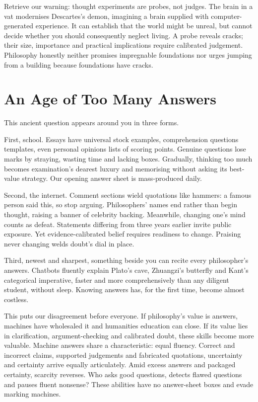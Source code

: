 Retrieve our warning: thought experiments are probes, not judges. The brain in a vat modernises Descartes's demon, imagining a brain supplied with computer-generated experience. It can establish that the world might be unreal, but cannot decide whether you should consequently neglect living. A probe reveals cracks; their size, importance and practical implications require calibrated judgement. Philosophy honestly neither promises impregnable foundations nor urges jumping from a building because foundations have cracks.

\section{An Age of Too Many Answers}
This ancient question appears around you in three forms.

First, school. Essays have universal stock examples, comprehension questions templates, even personal opinions lists of scoring points. Genuine questions lose marks by straying, wasting time and lacking boxes. Gradually, thinking too much becomes examination's dearest luxury and memorising without asking its best-value strategy. Our opening answer sheet is mass-produced daily.

Second, the internet. Comment sections wield quotations like hammers: a famous person said this, so stop arguing. Philosophers' names end rather than begin thought, raising a banner of celebrity backing. Meanwhile, changing one's mind counts as defeat. Statements differing from three years earlier invite public exposure. Yet evidence-calibrated belief requires readiness to change. Praising never changing welds doubt's dial in place.

Third, newest and sharpest, something beside you can recite every philosopher's answers. Chatbots fluently explain Plato's cave, Zhuangzi's butterfly and Kant's categorical imperative, faster and more comprehensively than any diligent student, without sleep. Knowing answers has, for the first time, become almost costless.

This puts our disagreement before everyone. If philosophy's value is answers, machines have wholesaled it and humanities education can close. If its value lies in clarification, argument-checking and calibrated doubt, these skills become more valuable. Machine answers share a characteristic: equal fluency. Correct and incorrect claims, supported judgements and fabricated quotations, uncertainty and certainty arrive equally articulately. Amid excess answers and packaged certainty, scarcity reverses. Who asks good questions, detects flawed questions and pauses fluent nonsense? These abilities have no answer-sheet boxes and evade marking machines.

